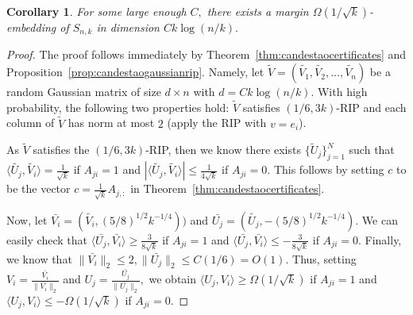 \documentclass[preprint]{article}
\newtheorem{corollary}{Corollary}[]
\newcommand{\ksparsen}{S_{n,k}}
\begin{document}
\begin{corollary}
\label{cor:sqrtkfromRIP}
For some large enough $C,$ there exists a margin $\Omega(1/\sqrt{k})$-embedding of $\ksparsen$ in dimension $Ck\log(n/k).$
\end{corollary}
\begin{proof} The proof follows immediately by Theorem~\ref{thm:candestaocertificates} and 
Proposition~\ref{prop:candestaogaussianrip}. Namely, let $\widetilde{V}= (\widetilde{V_1}, \widetilde{V_2}, \ldots, \widetilde{V_n})$ be a random Gaussian matrix of size $d\times n$ with $d = Ck\log(n/k).$ With high probability, the following two properties hold: $\widetilde{V}$ satisfies $(1/6, 3k)$-RIP and each column of $\widetilde{V}$ has norm at most $2$ (apply the RIP with $v = e_i$).

As $\widetilde{V}$ satisfies the $(1/6, 3k)$-RIP, then we know there exists $\{\widetilde{U}_j\}^N_{j = 1}$ such that $\langle \widetilde{U_j}, \widetilde{V_i}\rangle = \frac{1}{\sqrt{k}}$ if $A_{ji} = 1$ and 
$|\langle \widetilde{U_j}, \widetilde{V_i}\rangle|\le \frac{1}{4\sqrt{k}}$ if $A_{ji} = 0.$ This follows by setting $c$ to be the vector $c = \frac{1}{\sqrt{k}}A_{j, :}$ in Theorem~\ref{thm:candestaocertificates}.

Now, let $\bar{V_i} = (\widetilde{V_i}, (5/8)^{1/2}k^{-1/4}))$ and 
$\bar{U_j} = (\widetilde{U_j}, -(5/8)^{1/2}k^{-1/4}).$ We can easily check that $\langle \bar{U_j}, \bar{V_i}\rangle \ge \frac{3}{8\sqrt{k}}$ if $A_{ji} = 1$ and 
$\langle \bar{U_j}, \bar{V_i}\rangle\le -\frac{3}{8\sqrt{k}}$ if $A_{ji} = 0.$
Finally, we know that $\|\bar{V_i}\|_2\le 2, \|\bar{U_j}\|_2 \le C(1/6) = O(1).$ Thus, setting $V_i = \frac{\bar{V_i}}{\|\bar{V_i}\|_2}$ and 
$U_j = \frac{\bar{U_j}}{\|\bar{U_j}\|_2},$ we obtain 
$\langle {U_j}, {V_i}\rangle \ge \Omega(1/\sqrt{k})$ if $A_{ji} = 1$ and 
$\langle {U_j}, {V_i}\rangle\le -\Omega(1/\sqrt{k})$ if $A_{ji} = 0.$
\end{proof}
\end{document}
